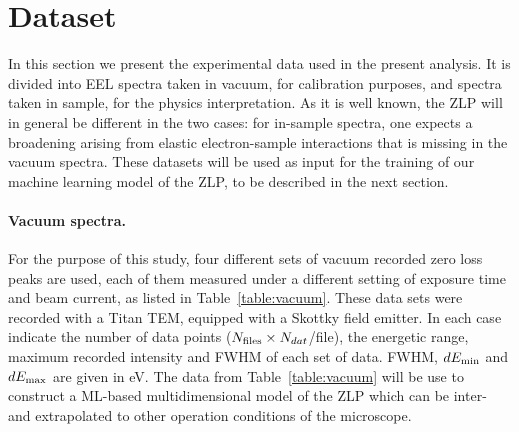 \section{Dataset}
\label{sec:dataset}

In this section we present the experimental data used
in the present analysis.
%
It is divided into EEL spectra taken in vacuum, for calibration
purposes, and spectra taken in sample, for the physics interpretation.
%
As it is well known, the ZLP will in general be different
in the two cases: for in-sample spectra, one expects a broadening
arising from elastic electron-sample interactions that is missing in
the vacuum spectra.
%
These datasets will be used as input for the training of our
machine learning model of the ZLP, to be described in the next section.

\paragraph{Vacuum spectra.}
%
For the purpose of this study, four different sets of vacuum recorded zero loss peaks are used, each of them measured under a different setting of exposure time and beam current, as listed in Table~\ref{table:vacuum}. These data sets were recorded with a Titan TEM, equipped with a Skottky field emitter.
%
In each case
indicate
the number of data points ($N_{\rm files}\times N_{dat}$/file), the energetic range, maximum recorded intensity and FWHM of each set of data. FWHM, $dE_{\rm min}$ and $dE_{\rm max}$ are given in eV.
%
The data from Table~\ref{table:vacuum} will be use to construct a ML-based
multidimensional model of the ZLP which can be inter- and extrapolated
to other operation conditions of the microscope.

